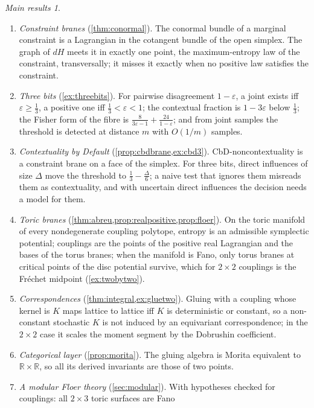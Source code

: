 \documentclass[11pt]{article}
\theoremstyle{definition}
\theoremstyle{remark}
\newtheorem*{mainthm}{Main results}
\newcommand{\R}{\mathbb{R}}
\begin{document}
\begin{mainthm}
\leavevmode
\begin{enumerate}[label=(\Alph*),leftmargin=*]
\item \emph{Constraint branes} (\cref{thm:conormal}). The conormal bundle of a marginal constraint is a Lagrangian in the
  cotangent bundle of the open simplex. The graph of $dH$ meets it in exactly one point, the maximum-entropy law of the
  constraint, transversally; it misses it exactly when no positive law satisfies the constraint.
\item \emph{Three bits} (\cref{ex:threebits}). For pairwise disagreement $1-\varepsilon$, a joint exists iff $\varepsilon\ge\frac13$, a
  positive one iff $\frac13<\varepsilon<1$; the contextual fraction is $1-3\varepsilon$ below $\frac13$; the Fisher form of the fibre is
  $\frac8{3\varepsilon-1}+\frac{24}{1-\varepsilon}$; and from joint samples the threshold is detected at distance $m$ with $O(1/m)$ samples.
\item \emph{Contextuality by Default} (\cref{prop:cbdbrane,ex:cbd3}). CbD-noncontextuality is a constraint brane on a face of the simplex.
  For three bits, direct influences of size $\Delta$ move the threshold to $\frac13-\frac{\Delta}6$; a naive test that ignores them misreads them as
  contextuality, and with uncertain direct influences the decision needs a model for them.
\item \emph{Toric branes} (\cref{thm:abreu,prop:realpositive,prop:floer}). On the toric manifold of every nondegenerate
  coupling polytope, entropy is an admissible symplectic potential; couplings are the points of the positive real Lagrangian
  and the bases of the torus branes; when the manifold is Fano, only torus branes at critical points of the disc potential
  survive, which for $2\times2$ couplings is the Fréchet midpoint (\cref{ex:twobytwo}).
\item \emph{Correspondences} (\cref{thm:integral,ex:gluetwo}). Gluing with a coupling whose kernel is $K$ maps lattice to
  lattice iff $K$ is deterministic or constant, so a non-constant stochastic $K$ is not induced by an equivariant correspondence; in the $2\times2$ case it scales the moment segment by the Dobrushin coefficient.
\item \emph{Categorical layer} (\cref{prop:morita}). The gluing algebra is Morita equivalent to $\R\times\R$, so all its derived
  invariants are those of two points.
\item \emph{A modular Floer theory} (\cref{sec:modular}). With hypotheses checked for couplings: all $2\times3$ toric surfaces are Fano

\end{enumerate}
\end{mainthm}
\end{document}
